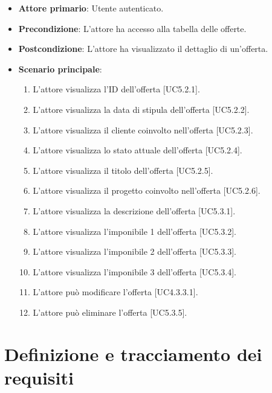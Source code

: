 \begin{itemize}
\item \textbf{Attore primario}: Utente autenticato.
\item \textbf{Precondizione}: L'attore ha accesso alla tabella delle offerte.
\item \textbf{Postcondizione}: L'attore ha visualizzato il dettaglio di un'offerta.
\item \textbf{Scenario principale}: 
\begin{enumerate}
\item L'attore visualizza l'ID dell'offerta [UC5.2.1].
\item L'attore visualizza la data di stipula dell'offerta [UC5.2.2].
\item L'attore visualizza il cliente coinvolto nell'offerta [UC5.2.3].
\item L'attore visualizza lo stato attuale dell'offerta [UC5.2.4].
\item L'attore visualizza il titolo dell'offerta [UC5.2.5].
\item L'attore visualizza il progetto coinvolto nell'offerta [UC5.2.6].
\item L'attore visualizza la descrizione dell'offerta [UC5.3.1].
\item L'attore visualizza l'imponibile 1 dell'offerta [UC5.3.2].
\item L'attore visualizza l'imponibile 2 dell'offerta [UC5.3.3].
\item L'attore visualizza l'imponibile 3 dell'offerta [UC5.3.4].
\item L'attore può modificare l'offerta [UC4.3.3.1].
\item L'attore può eliminare l'offerta [UC5.3.5].
\end{enumerate}
\end{itemize}

\pagebreak

\section{Definizione e tracciamento dei requisiti}

